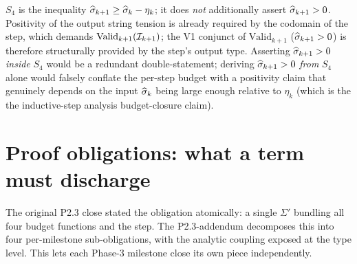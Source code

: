 \begin{remark}
\label{rem:no-double-positivity}
$S_4$ is the inequality $\widehat{\sigma}_{k+1} \ge \widehat{\sigma}_k - \eta_k$; it does \emph{not} additionally assert $\widehat{\sigma}_{k+1} > 0$.  Positivity of the output string tension is already required by the codomain of the step, which demands $\mathrm{Valid}_{k+1}(\mathcal{I}_{k+1})$; the V1 conjunct of $\mathrm{Valid}_{k+1}$ ($\widehat{\sigma}_{k+1} > 0$) is therefore structurally provided by the step's output type.  Asserting $\widehat{\sigma}_{k+1} > 0$ \emph{inside} $S_4$ would be a redundant double-statement; deriving $\widehat{\sigma}_{k+1} > 0$ \emph{from} $S_4$ alone would falsely conflate the per-step budget with a positivity claim that genuinely depends on the input $\widehat{\sigma}_k$ being large enough relative to $\eta_k$ (which is the the inductive-step analysis budget-closure claim).
\end{remark}

\section{Proof obligations: what a term must discharge}
\label{sec:obligations}

The original P2.3 close stated the obligation atomically: a single
$\Sigma'$ bundling all four budget functions and the step.  The
P2.3-addendum decomposes this into four per-milestone
sub-obligations, with the analytic coupling exposed at the type
level.  This lets each Phase-3 milestone close its own piece
independently.

